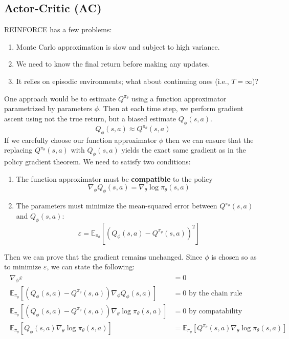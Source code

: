 \documentclass[journal, onecolumn, 12pt, draftclsnofoot]{IEEEtran}
\newcommand{\kword}[1]{\textbf{#1}}
\begin{document}
		\subsection{Actor-Critic (AC)}
		\par REINFORCE has a few problems:
		\begin{enumerate}
			\item Monte Carlo approximation is slow and subject to high variance.
			\item We need to know the final return before making any updates.
			\item It relies on episodic environments; what about continuing ones (i.e., $T = \infty$)?
		\end{enumerate}
		\par One approach would be to estimate $Q^{\pi_\theta}$ using a function approximator parametrized by parameters $\phi$. Then at each time step, we perform gradient ascent using not the true return, but a biased estimate $Q_\phi(s,a)$.
		\begin{equation}
			\label{eqn:action-value-critic-appx-equal}
			Q_\phi(s,a) \approx Q^{\pi_\theta}(s,a)
		\end{equation}
		If we carefully choose our function approximator $\phi$ then we can ensure that the replacing $ Q^{\pi_\theta}(s,a)$ with $Q_\phi(s,a)$ yields the exact same gradient as in the policy gradient theorem. We need to satisfy two conditions:
		\begin{enumerate}
			\item The function approximator must be \kword{compatible} to the policy
			\begin{equation}
				\label{eqn:compatible}
				\nabla_\phi Q_\phi(s,a) = \nabla_\theta \log \pi_\theta (s,a)
			\end{equation}
			\item The parameters must minimize the mean-squared error between $Q^{\pi_\theta}(s,a)$ and $Q_\phi(s,a)$:
			\begin{equation}
				\label{eqn:minimize-mean-squared-error}
				\varepsilon = \mathbb{E}_{\pi_\theta} \left[ (Q_\phi(s,a) - Q^{\pi_\theta}(s,a))^2 \right]
			\end{equation}
		\end{enumerate}
		Then we can prove that the gradient remains unchanged. Since $\phi$ is chosen so as to minimize $\varepsilon$, we can state the following:
		\begin{align}
			\label{eqn:proof-of-exactness}
			\begin{split}
				\nabla_\phi \varepsilon &= 0 \\
				\mathbb{E}_{\pi_\theta} \left[ (Q_\phi(s,a) - Q^{\pi_\theta}(s,a)) \nabla_\phi Q_\phi(s,a) \right] &= 0 \text{ by the chain rule} \\
				\mathbb{E}_{\pi_\theta} \left[ (Q_\phi(s,a) - Q^{\pi_\theta}(s,a)) \nabla_\theta \log \pi_\theta (s,a) \right] &= 0 \text{ by compatability} \\
				\mathbb{E}_{\pi_\theta} \left[ Q_\phi(s,a) \nabla_\theta \log \pi_\theta (s,a) \right] &= \mathbb{E}_{\pi_\theta} \left[ Q^{\pi_\theta}(s,a) \nabla_\theta \log \pi_\theta (s,a) \right]
			\end{split}
		\end{align}
\end{document}
